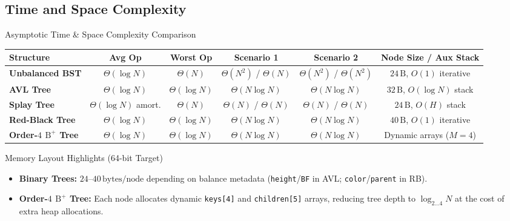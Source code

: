 \documentclass[aspectratio=169, 10pt, xcolor={x11names}]{beamer}
\newcommand{\code}[1]{\texttt{\color{primary!90!black}#1}}
\begin{document}
\subsection{Time and Space Complexity}
\begin{frame}{Asymptotic Time \& Space Complexity Comparison}
\renewcommand{\arraystretch}{1.18}
\scriptsize
\begin{tabular}{@{}lccccc@{}}
\toprule
\textbf{\color{primary}Structure} & \textbf{\color{primary}Avg Op} & \textbf{\color{primary}Worst Op} & \textbf{\color{primary}Scenario 1} & \textbf{\color{primary}Scenario 2} & \textbf{\color{primary}Node Size / Aux Stack} \\
\midrule
\textbf{Unbalanced BST}   & $\Theta(\log N)$ & $\Theta(N)$        & $\Theta(N^2)$ / $\Theta(N)$ & $\Theta(N^2)$ / $\Theta(N^2)$ & $24\,\text{B}$, $O(1)$ iterative \\
\textbf{AVL Tree}         & $\Theta(\log N)$ & $\Theta(\log N)$   & $\Theta(N\log N)$           & $\Theta(N\log N)$             & $32\,\text{B}$, $O(\log N)$ stack \\
\textbf{Splay Tree}       & $\Theta(\log N)$ amort. & $\Theta(N)$ & $\Theta(N)$ / $\Theta(N)$   & $\Theta(N)$ / $\Theta(N)$     & $24\,\text{B}$, $O(H)$ stack \\
\textbf{Red-Black Tree}   & $\Theta(\log N)$ & $\Theta(\log N)$   & $\Theta(N\log N)$           & $\Theta(N\log N)$             & $40\,\text{B}$, $O(1)$ iterative \\
\textbf{Order-$4$ $\text{B}^+$ Tree} & $\Theta(\log N)$ & $\Theta(\log N)$ & $\Theta(N\log N)$    & $\Theta(N\log N)$             & Dynamic arrays ($M=4$) \\
\bottomrule
\end{tabular}

\vspace{0.55em}
\begin{block}{\footnotesize Memory Layout Highlights (64-bit Target)}
\footnotesize
\begin{itemize}\setlength{\itemsep}{0.25em}
  \item \textbf{Binary Trees:} $24\text{--}40\,\text{bytes/node}$ depending on balance metadata (\code{height}/\code{BF} in AVL; \code{color}/\code{parent} in RB).
  \item \textbf{Order-$4$ $\text{B}^+$ Tree:} Each node allocates dynamic \code{keys[4]} and \code{children[5]} arrays, reducing tree depth to $\log_{2\dots 4} N$ at the cost of extra heap allocations.
\end{itemize}
\end{block}
\end{frame}
\end{document}
